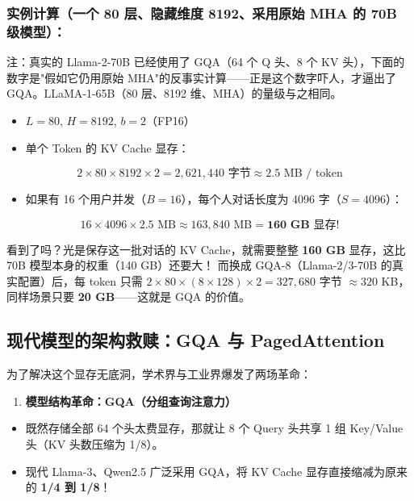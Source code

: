 \subsubsection{实例计算（一个 80 层、隐藏维度 8192、采用原始 MHA 的 70B 级模型）：}

\begin{noteBox}[核心导读与背景]
注：真实的 Llama-2-70B 已经使用了 GQA（64 个 Q 头、8 个 KV 头），下面的数字是"假如它仍用原始 MHA"的反事实计算——正是这个数字吓人，才逼出了 GQA。LLaMA-1-65B（80 层、8192 维、MHA）的量级与之相同。
\end{noteBox}

\begin{itemize}
  \item $L = 80$, $H = 8192$, $b = 2$（FP16）
  \item 单个 Token 的 KV Cache 显存：
\end{itemize}

\[
2 \times 80 \times 8192 \times 2 = 2,621,440 \text{ 字节} \approx 2.5 \text{ MB / token}
\]

\begin{itemize}
  \item 如果有 16 个用户并发（$B=16$），每个人对话长度为 4096 字（$S=4096$）：
\end{itemize}

\[
16 \times 4096 \times 2.5 \text{ MB} \approx 163,840 \text{ MB} = \mathbf{160 \text{ GB 显存}}!
\]

看到了吗？光是保存这一批对话的 KV Cache，就需要整整 \textbf{160 GB} 显存，这比 70B 模型本身的权重（140 GB）还要大！
而换成 GQA-8（Llama-2/3-70B 的真实配置）后，每 token 只需 $2 \times 80 \times (8 \times 128) \times 2 = 327{,}680$ 字节 $\approx 320$ KB，同样场景只要 \textbf{20 GB}——这就是 GQA 的价值。

\subsection{现代模型的架构救赎：GQA 与 PagedAttention}

为了解决这个显存无底洞，学术界与工业界爆发了两场革命：
\begin{enumerate}
  \item \textbf{模型结构革命：GQA（分组查询注意力）}
\end{enumerate}

\begin{itemize}
  \item 既然存储全部 64 个头太费显存，那就让 8 个 Query 头共享 1 组 Key/Value 头（KV 头数压缩为 1/8）。
  \item 现代 Llama-3、Qwen2.5 广泛采用 GQA，将 KV Cache 显存直接缩减为原来的 \textbf{1/4 到 1/8}！
\end{itemize}

